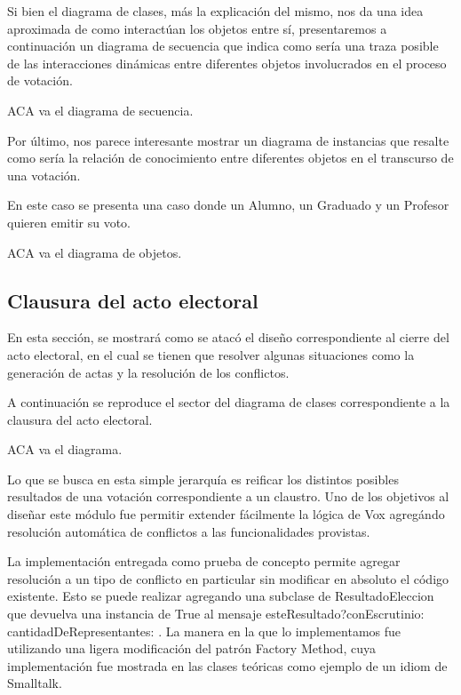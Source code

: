 \bigskip

Si bien el diagrama de clases, m\'as la explicaci\'on del mismo, nos da una idea aproximada de como interact\'uan los objetos entre s\'i, presentaremos a continuaci\'on un diagrama de secuencia que indica como ser\'ia una traza posible de las interacciones din\'amicas entre diferentes objetos involucrados en el proceso de votaci\'on.

ACA va el diagrama de secuencia.

\bigskip

Por \'ultimo, nos parece interesante mostrar un diagrama de instancias que resalte como ser\'ia la relaci\'on de conocimiento entre diferentes objetos en el transcurso de una votaci\'on.

En este caso se presenta una caso donde un Alumno, un Graduado y un Profesor quieren emitir su voto.

ACA va el diagrama de objetos.



\subsection{Clausura del acto electoral}

En esta secci\'on, se mostrar\'a como se atac\'o el diseño correspondiente al cierre del acto electoral, en el cual se tienen que resolver algunas situaciones como la generaci\'on de actas y la resoluci\'on de los conflictos.

A continuaci\'on se reproduce el sector del diagrama de clases correspondiente a la clausura del acto electoral.


ACA va el diagrama.



Lo que se busca en esta simple jerarquía es reificar los distintos posibles resultados de una votación correspondiente a un claustro. Uno de los objetivos al diseñar este módulo fue permitir extender fácilmente la lógica de Vox agregándo resolución automática de conflictos a las funcionalidades provistas.

La implementación entregada como prueba de concepto permite agregar resolución a un tipo de conflicto en particular sin modificar en absoluto el código existente. Esto se puede realizar agregando una subclase de ResultadoEleccion que devuelva una instancia de True al mensaje esteResultado?conEscrutinio: cantidadDeRepresentantes: . La manera en la que lo implementamos fue utilizando una ligera modificación del patrón Factory Method, cuya implementación fue mostrada en las clases teóricas como ejemplo de un idiom de Smalltalk. 

